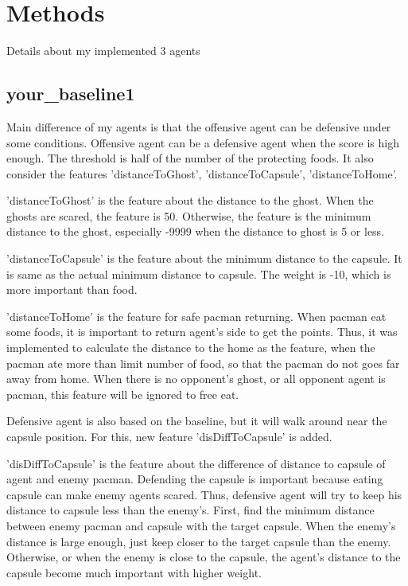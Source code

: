 \documentclass{article}
\theoremstyle{plain}
\theoremstyle{definition}
\theoremstyle{remark}
\begin{document}
\section{Methods}
Details about my implemented 3 agents

\subsection{your\_baseline1}

Main difference of my agents is that the offensive agent can be defensive under some conditions. Offensive agent can be a defensive agent when the score is high enough. The threshold is half of the number of the protecting foods. It also consider the features 'distanceToGhost', 'distanceToCapsule', 'distanceToHome'.

'distanceToGhost' is the feature about the distance to the ghost. When the ghosts are scared, the feature is 50. Otherwise, the feature is the minimum distance to the ghost, especially -9999 when the distance to ghost is 5 or less.

'distanceToCapsule' is the feature about the minimum distance to the capsule. It is same as the actual minimum distance to capsule. The weight is -10, which is more important than food.

'distanceToHome' is the feature for safe pacman returning. When pacman eat some foods, it is important to return agent's side to get the points. Thus, it was implemented to calculate the distance to the home as the feature, when the pacman ate more than limit number of food, so that the pacman do not goes far away from home. When there is no opponent's ghost, or all opponent agent is pacman, this feature will be ignored to free eat.

Defensive agent is also based on the baseline, but it will walk around near the capsule position. For this, new feature 'disDiffToCapsule' is added.

'disDiffToCapsule' is the feature about the difference of distance to capsule of agent and enemy pacman. Defending the capsule is important because eating capsule can make enemy agents scared. Thus, defensive agent will try to keep his distance to capsule less than the enemy's. First, find the minimum distance between enemy pacman and capsule with the target capsule. When the enemy's distance is large enough, just keep closer to the target capsule than the enemy. Otherwise, or when the enemy is close to the capsule, the agent's distance to the capsule become much important with higher weight.
\end{document}
